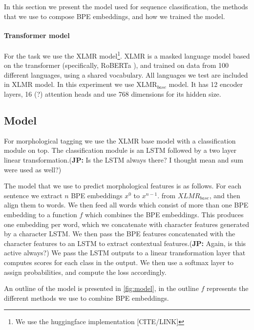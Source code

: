 \documentclass[11pt]{article}
\newcommand\jp[1]{(\textbf{JP:} #1)}
\begin{document}
	In this section we present the model used for sequence
        classification, the methods that we use to compose BPE
        embeddings, and how we trained the model.
	
	\paragraph{Transformer model}
        	For the task we use the XLMR
     \citep{conneau2019unsupervised} model\footnote{We use the
     huggingface implementation [CITE/LINK]}. XLMR is a masked
     language model based on the transformer (specifically, RoBERTa
     \citep{liu2019roberta}), and trained on data from 100 different
     languages, using a shared vocabulary. All languages we test are
     included in XLMR model. In this experiment we use
     \textsc{XLMR}$_{base}$ model. It has 12 encoder layers, 16 (?)
      attention heads and use 768 dimensions for its hidden size.
	
	\subsection{Model}
	For morphological tagging we use the XLMR base model with a
        classification module on top. The classification module is an
        LSTM followed by a two layer linear transformation.\jp{Is the
          LSTM always there? I thought mean and sum were used as
          well?}
	
	The model that we use to predict morphological features is as
        follows. For each sentence we extract $n$ BPE embeddings $x^0$
        to $x^{n-1}$. from $XLMR_{base}$, and then align them to
        words.  We then feed all words which consist of more than one
        BPE embedding to a function $f$ which combines the BPE
        embeddings. This produces one embedding per word, which we
        concatenate with character features generated by a character
        LSTM. We then pass the BPE features concatenated with the
        character features to an LSTM to extract contextual
        features.\jp{Again, is this active always?}  We pass the LSTM
        outputs to a linear transformation layer that computes scores
        for each class in the output. We then use a softmax layer to
        assign probabilities, and compute the loss accordingly.
	
	An outline of the model is presented in \cref{fig:model}, in
        the outline $f$ represents the different methods we use to
        combine BPE embeddings.
	
\end{document}
